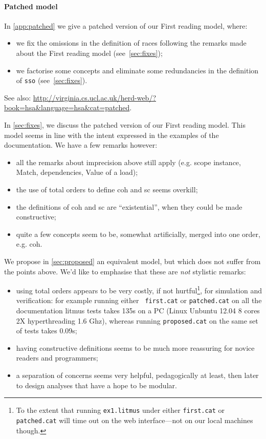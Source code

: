 \documentclass[a4paper]{article}
\begin{document}
\paragraph{Patched model}

In \myapp\ref{app:patched} we give a patched version of our First reading
model, where:
\begin{itemize}
\item we fix the omissions in the definition of races following the remarks
made about the First reading model (see~\mysec\ref{sec:fixes});
\item we factorise some concepts and eliminate some redundancies in the
definition of {\tt sso} (see~\mysec\ref{sec:fixes}).
\end{itemize}
See also:
\url{http://virginia.cs.ucl.ac.uk/herd-web/?book=hsa&language=hsa&cat=patched}.

In \mysec\ref{sec:fixes}, we discuss the patched version of our First reading
model. This model seems in line with the intent expressed in the examples of the
documentation. We have a few remarks however:
\begin{itemize}
\item all the remarks about imprecision above still apply (e.g. scope instance,
Match, dependencies, Value of a load);
\item the use of total orders to define coh and sc seems overkill;
\item the definitions of coh and sc are ``existential'', when they could be
made constructive;
\item quite a few concepts seem to be, somewhat artificially, merged into one
order, e.g. coh.
\end{itemize}

We propose in \mysec\ref{sec:proposed} an equivalent model, but which does not
suffer from the points above. We'd like to emphasise that these are \emph{not}
stylistic remarks: 
\begin{itemize}
\item using total orders appears to be very costly, if not hurtful\footnote{To
the extent that running {\tt ex1.litmus} under either {\tt first.cat} or {\tt
patched.cat} will time out on the web interface---not on our local machines
though.}, for simulation and verification: for example running either {\tt
first.cat} or {\tt patched.cat} on all the documentation litmus tests takes
135s on a PC (Linux Unbuntu 12.04 8 cores 2X hyperthreading 1.6 Ghz), whereas
running {\tt proposed.cat} on the same set of tests takes 0.09s; 
\item having constructive definitions seems to be much more reassuring for
novice readers and programmers; 
\item a separation of concerns seems very helpful, pedagogically
at least, then later to design analyses that have a hope to be modular.
\end{itemize}
\end{document}
